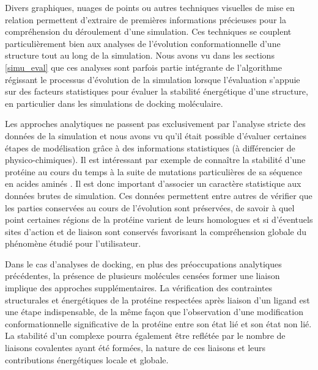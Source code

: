 
Divers graphiques, nuages de points ou autres techniques visuelles de mise en relation permettent d'extraire de premières informations précieuses pour la compréhension du déroulement d'une simulation. Ces techniques se couplent particulièrement bien aux analyses de l'évolution conformationnelle d'une structure tout au long de la simulation. Nous avons vu dans les sections \ref{simu_eval} que ces analyses sont parfois partie intégrante de l'algorithme régissant le processus d'évolution de la simulation lorsque l'évaluation s'appuie sur des facteurs statistiques pour évaluer la stabilité énergétique d'une structure, en particulier dans les simulations de docking moléculaire.

Les approches analytiques ne passent pas exclusivement par l'analyse stricte des données de la simulation et nous avons vu qu'il était possible d'évaluer certaines étapes de modélisation grâce à des informations statistiques (à différencier de physico-chimiques). Il est intéressant par exemple de connaître la stabilité d'une protéine au cours du temps à la suite de mutations particulières de sa séquence en acides aminés \cite{masso2008accurate}. Il est donc important d'associer un caractère statistique aux données brutes de simulation. Ces données permettent entre autres de vérifier que les parties conservées au cours de l'évolution sont préservées, de savoir à quel point certaines régions de la protéine varient de leurs homologues et si d'éventuels sites d'action et de liaison sont conservés favorisant la compréhension globale du phénomène étudié pour l'utilisateur.

Dans le cas d'analyses de docking, en plus des préoccupations analytiques précédentes, la présence de plusieurs molécules censées former une liaison implique des approches supplémentaires. La vérification des contraintes structurales et énergétiques de la protéine respectées après liaison d'un ligand est une étape indispensable, de la même façon que l'observation d'une modification conformationnelle significative de la protéine entre son état lié et son état non lié. La stabilité d'un complexe pourra également être reflétée par le nombre de liaisons covalentes ayant été formées, la nature de ces liaisons et leurs contributions énergétiques locale et globale.

